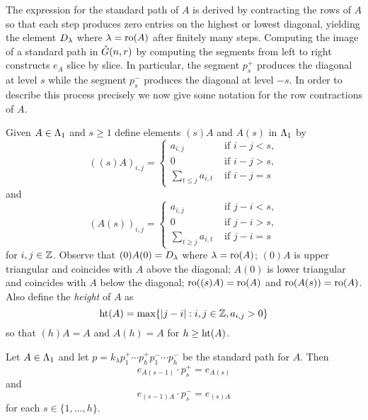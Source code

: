\documentclass[a4paper, 11pt]{report}
\begin{document}
The expression for the standard path of $A$ is derived by contracting the rows of $A$ so that each step produces zero entries on the highest or lowest diagonal, yielding the element $D_{\lambda}$ where $\lambda=\operatorname{ro}(A)$ after finitely many steps. Computing the image of a standard path in $\hat{G}(n,r)$ by computing the segments from left to right constructs $e_A$ slice by slice. In particular, the segment $p_s^+$ produces the diagonal at level $s$ while the segment $p_s^-$ produces the diagonal at level $-s$. In order to describe this process precisely we now give some notation for the row contractions of $A$.

Given $A\in\Lambda_1{}$ and $s\geq 1$ define elements $(s)A$ and $A(s)$ in $\Lambda_1{}$ by
\begin{equation*}
\left((s)A\right)_{i,j} = \begin{cases}
a_{i,j} &\text{ if } i-j<s,\\
0 &\text{ if } i-j>s,\\
\sum_{t\le j} a_{i,t} &\text{ if } i-j=s
\end{cases}
\end{equation*}
and
\begin{equation*}
\left(A(s)\right)_{i,j} = \begin{cases}
a_{i,j} &\text{ if } j-i<s,\\
0 &\text{ if } j-i>s,\\
\sum_{t\geq j} a_{i,t} &\text{ if } j-i=s
\end{cases}
\end{equation*}
for $i,j\in\mathbb{Z}$. Observe that $(0)A(0)=D_{\lambda}$ where $\lambda=\operatorname{ro}(A)$; $(0)A$ is upper triangular and coincides with $A$ above the diagonal; $A(0)$ is lower triangular and coincides with $A$ below the diagonal; $\operatorname{ro}((s)A)=\operatorname{ro}(A)$ and $\operatorname{ro}(A(s))=\operatorname{ro}(A)$. Also define the \emph{height} of $A$ as
\begin{equation*}
\operatorname{ht}(A) = \max\{|j-i|:i,j\in\mathbb{Z}, a_{i,j}>0\}
\end{equation*}
so that $(h)A=A$ and $A(h)=A$ for $h\geq\operatorname{ht}(A)$.

\begin{lemma}\label{lemma:slice-by-slice}
Let $A\in\Lambda_1{}$ and let $p=k_\lambda p_1^+ \cdots p_h^+ p_1^-\cdots p_h^-$ be the standard path for $A$. Then
\begin{equation*}
e_{A(s-1)}\cdot p_s^+ = e_{A(s)}
\end{equation*}
and
\begin{equation*}
e_{(s-1)A}\cdot p_s^- = e_{(s)A}
\end{equation*}
for each $s\in\{1,\ldots,h\}$.
\end{lemma}
\end{document}
